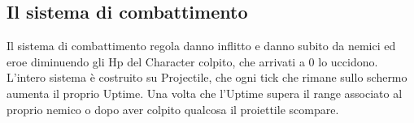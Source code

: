 \documentclass[12pt]{article}
\begin{document}
\subsection*{Il sistema di combattimento}
Il sistema di combattimento regola danno inflitto e danno subito da nemici ed eroe diminuendo gli Hp del Character colpito, che arrivati a 0 lo uccidono. 
L'intero sistema è costruito su Projectile, che ogni tick che rimane sullo schermo aumenta il proprio Uptime.
Una volta che l'Uptime supera il range associato al proprio nemico o dopo aver colpito qualcosa il proiettile scompare.
\end{document}
